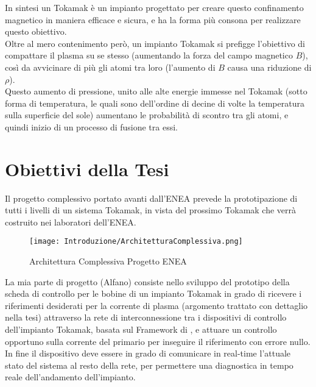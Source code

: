 In sintesi un Tokamak è un impianto progettato per creare questo confinamento magnetico in maniera efficace e sicura, e ha la forma più consona per realizzare questo obiettivo.\\
Oltre al mero contenimento però, un impianto Tokamak si prefigge l'obiettivo di compattare il plasma su se stesso (aumentando la forza del campo magnetico $ B $), così da avvicinare di più gli atomi tra loro (l'aumento di $ B $ causa una riduzione di $ \rho $).\\
Questo aumento di pressione, unito alle alte energie immesse nel Tokamak (sotto forma di temperatura, le quali sono dell'ordine di decine di volte la temperatura sulla superficie del sole) aumentano le probabilità di scontro tra gli atomi, e quindi inizio di un processo di fusione tra essi. 

\section*{Obiettivi della Tesi}
Il progetto complessivo portato avanti dall'ENEA prevede la prototipazione di tutti i livelli di un sistema Tokamak, in vista del prossimo Tokamak che verrà costruito nei laboratori dell'ENEA.
\begin{figure}[H]
	\centering
	\caption[Architettura Complessiva Progetto ENEA]{Architettura Complessiva Progetto ENEA}
	\texttt{[image: Introduzione/ArchitetturaComplessiva.png]}
\end{figure}
\noindent
La mia parte di progetto ({\color{red}Alfano})  consiste nello sviluppo del prototipo della scheda di controllo per le bobine di un impianto Tokamak in grado di ricevere i riferimenti desiderati per la corrente di plasma (argomento trattato con dettaglio nella tesi) attraverso la rete di interconnessione tra i dispositivi di controllo dell'impianto Tokamak, basata sul Framework di \MARTe, e attuare un controllo opportuno sulla corrente del primario per inseguire il riferimento con errore nullo.\\
In fine il dispositivo deve essere in grado di comunicare in real-time l'attuale stato del sistema al resto della rete, per permettere una diagnostica in tempo reale dell'andamento dell'impianto.\\